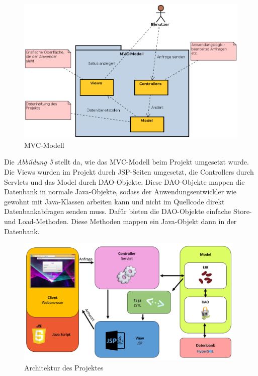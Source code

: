 \documentclass[12pt, a4paper]{article}
\begin{document}
\begin{figure}[H]
	\begin{center}
		\includegraphics[width=124mm]{Bilder/MVC-Modell.png}
	\end{center}
	\caption{MVC-Modell}
\end{figure}

Die \textit{Abbildung 5} stellt da, wie das MVC-Modell beim Projekt umgesetzt wurde. Die \glqq Views\grqq{} wurden im Projekt durch JSP-Seiten umgesetzt, die \glqq Controllers\grqq{} durch Servlets und das \glqq Model\grqq{} durch DAO-Objekte. Diese DAO-Objekte mappen die Datenbank in normale Java-Objekte, sodass der Anwendungsentwickler wie gewohnt mit Java-Klassen arbeiten kann und nicht im Quellcode direkt Datenbankabfragen senden muss. Dafür bieten die DAO-Objekte einfache \glqq Store\grqq{}- und \glqq Load\grqq{}-Methoden. Diese Methoden mappen ein Java-Objekt dann in der Datenbank. 
\begin{figure}[H]
	\begin{center}
		\includegraphics[width=110mm]{Bilder/archDiagramm.png}
	\end{center}
	\caption{Architektur des Projektes}
\end{figure}
\end{document}
